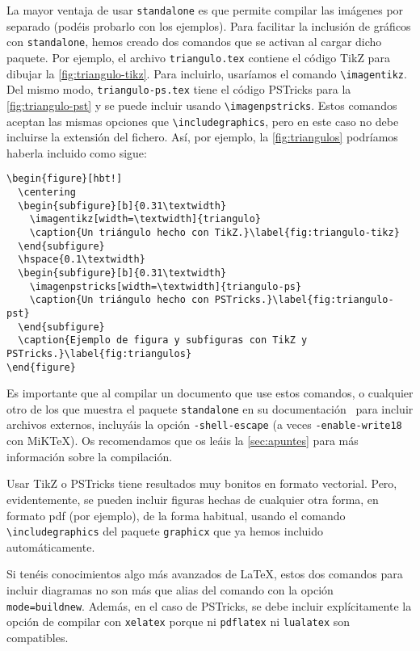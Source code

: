 \documentclass[bibtex, anon]{TEMat-article}
\begin{document}
La mayor ventaja de usar \verb+standalone+ es que permite compilar las imágenes por separado (podéis probarlo con los ejemplos).
Para facilitar la inclusión de gráficos con \verb+standalone+, hemos creado dos comandos que se activan al cargar dicho paquete.
Por ejemplo, el archivo \verb+triangulo.tex+ contiene el código TikZ para dibujar la \cref{fig:triangulo-tikz}.
Para incluirlo, usaríamos el comando \verb+\imagentikz+.
Del mismo modo, \verb+triangulo-ps.tex+ tiene el código PSTricks para la \cref{fig:triangulo-pst} y se puede incluir usando \verb+\imagenpstricks+.
Estos comandos aceptan las mismas opciones que \verb+\includegraphics+, pero en este caso no debe incluirse la extensión del fichero.
Así, por ejemplo, la \cref{fig:triangulos} podríamos haberla incluido como sigue:
\begin{verbatim}
\begin{figure}[hbt!]
  \centering
  \begin{subfigure}[b]{0.31\textwidth}
    \imagentikz[width=\textwidth]{triangulo}
    \caption{Un triángulo hecho con TikZ.}\label{fig:triangulo-tikz}
  \end{subfigure}
  \hspace{0.1\textwidth}
  \begin{subfigure}[b]{0.31\textwidth}
    \imagenpstricks[width=\textwidth]{triangulo-ps}
    \caption{Un triángulo hecho con PSTricks.}\label{fig:triangulo-pst}
  \end{subfigure}
  \caption{Ejemplo de figura y subfiguras con TikZ y PSTricks.}\label{fig:triangulos}
\end{figure}
\end{verbatim}

Es importante que al compilar un documento que use estos comandos, o cualquier otro de los que muestra el paquete \verb+standalone+ en su documentación~\cite{standalone} para incluir archivos externos, incluyáis la opción \verb+-shell-escape+ (a veces \verb+-enable-write18+ con MiK\TeX).
Os recomendamos que os leáis la \cref{sec:apuntes} para más información sobre la compilación.

Usar TikZ o PSTricks tiene resultados muy bonitos en formato vectorial.
Pero, evidentemente, se pueden incluir figuras hechas de cualquier otra forma, en formato pdf (por ejemplo), de la forma habitual, usando el comando \verb+\includegraphics+ del paquete \verb+graphicx+ que ya hemos incluido automáticamente.

\begin{nota}
Si tenéis conocimientos algo más avanzados de \LaTeX{}, estos dos comandos para incluir diagramas no son más que alias del comando \verb++ con la opción \verb+mode=buildnew+.
Además, en el caso de PSTricks, se debe incluir explícitamente la opción de compilar con \verb+xelatex+ porque ni \verb+pdflatex+ ni \verb+lualatex+ son compatibles.
\end{nota}
\end{document}

